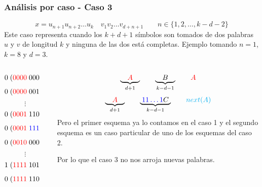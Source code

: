 \documentclass[10pt,mathserif]{beamer}%
\begin{document}
\begin{frame}
  \frametitle{Análisis por caso - Caso 3}
  $$x = u_{n+1} u_{n+2} \dots u_k \quad  v_1 v_2 \dots v_{d+n+1}   \qquad n \in \{1,2,\dots ,k - d - 2\}  $$
  Este caso representa cuando los $k + d + 1$ símbolos son tomados de dos palabras $u$ y $v$ de longitud $k$ y ninguna de las dos está completas.
  Ejemplo tomando $n = 1$, $k = 8$ y $d = 3$.
  \begin{columns}
    \begin{column}{0.5\textwidth}
      \begin{small}

      $$0\; (\textcolor{red}{0000}\; 000 \qquad 0 \;\textcolor{red}{0000} ) \;001$$
      $$0\; (\textcolor{red}{0000} \;001 \qquad 0 \;\textcolor{red}{0000} ) \;010$$
      $$\vdots$$
      $$0\; (\textcolor{red}{0001} \;110 \qquad 0 \;\textcolor{red}{0001} ) \;111$$
      $$0\; (\textcolor{red}{0001} \;\textcolor{blue}{111} \qquad 0 \;\textcolor{cyan}{0010} ) \;000$$
      $$0\; (\textcolor{red}{0010} \;000 \qquad 0 \;\textcolor{red}{0010} ) \;001$$
      $$\vdots$$
      $$1\; (\textcolor{red}{1111} \;101 \qquad 1 \;\textcolor{red}{1111} ) \;110$$
      $$0\; (\textcolor{red}{1111} \;110 \qquad 1 \;\textcolor{red}{1111} ) \;111$$
      \end{small}
    \end{column}
    \begin{column}{0.5\textwidth}  %
      \pause
      $$\underbrace{\quad \textcolor{red}{A} \quad }_{d +1} \qquad \underbrace{\quad B \quad }_{k - d - 1}  \qquad \textcolor{red}{A}$$
      $$\underbrace{\quad \textcolor{red}{A} \quad }_{d +1} \qquad \underbrace{\; \textcolor{blue}{11\dots1}C \; }_{k - d - 1}  \qquad \textcolor{cyan}{next(A)}$$
      \pause
      Pero el primer esquema ya lo contamos en el caso 1 y el segundo esquema es un caso particular de uno de los esquemas del caso 2.
      
      Por lo que el caso 3 no nos arroja nuevas palabras.
    \end{column}
    \end{columns}
\end{frame}
\end{document}
